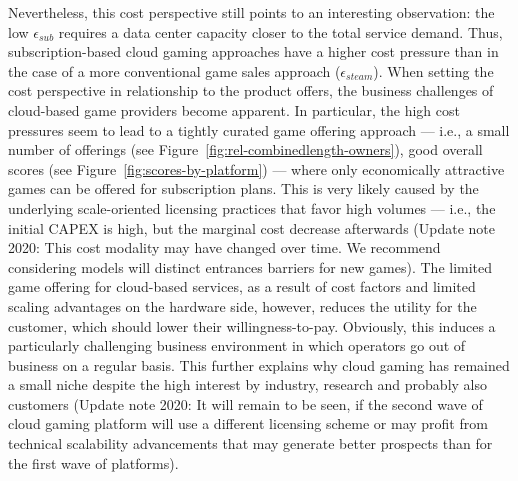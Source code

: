 Nevertheless, this cost perspective still points to an interesting observation: the low $\epsilon_{sub}$ requires a data center capacity closer to the total service demand. Thus, subscription-based cloud gaming approaches have a higher cost pressure than in the case of a more conventional game sales approach ($\epsilon_{steam}$). When setting the cost perspective in relationship to the product offers, the business challenges of cloud-based game providers become apparent. In particular, the high cost pressures seem to lead to a tightly curated game offering approach --- i.e., a small number of offerings (see Figure~\ref{fig:rel-combinedlength-owners}), good overall scores (see Figure~\ref{fig:scores-by-platform}) --- where only economically attractive games can be offered for subscription plans. This is very likely caused by the underlying scale-oriented licensing practices that favor high volumes --- i.e., the initial \gls{CAPEX} is high, but the marginal cost decrease afterwards (Update note 2020: This cost modality may have changed over time. We recommend considering models will distinct entrances barriers for new games). The limited game offering for cloud-based services, as a result of cost factors and limited scaling advantages on the hardware side, however, reduces the utility for the customer, which should lower their willingness-to-pay. Obviously, this induces a particularly challenging business environment in which operators go out of business on a regular basis. This further explains why cloud gaming has remained a small niche despite the high interest by industry, research and probably also customers (Update note 2020: It will remain to be seen, if the second wave of cloud gaming platform will use a different licensing scheme or may profit from technical scalability advancements that may generate better prospects than for the first wave of platforms).
